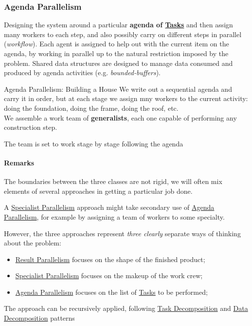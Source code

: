 \subsubsection{Agenda Parallelism}\label{sub:ed_agenda_parallelism} %
Designing the system around a particular \textbf{agenda of \hyperref[def:task]{Tasks}} and then assign many workers to each step, and also possibly carry on different steps in parallel (\textit{workflow}).
Each agent is assigned to help out with the current item on the agenda, by working in parallel up to the natural restriction imposed by the problem.
\emptyln{}
Shared data structures are designed to manage data consumed and produced by agenda activities (e.g. \textit{bounded-buffers}).
\begin{example}{Agenda Parallelism: Building a House}{}
    We write out a sequential agenda and carry it in order, but at each stage we assign mny workers to the current activity: doing the foundation, doing the frame, doing the roof, etc.
    \\
    We assemble a work team of \textbf{generalists}, each one capable of performing any construction step.
    \begin{note}
        The team is set to work stage by stage following the agenda
    \end{note}
\end{example}
%
\paragraph{Remarks}\label{par:ed_cc_remarks} %
The boundaries between the three classes are not rigid, we will often mix elements of several approaches in getting a particular job done.
\begin{example}{}{}
    A \hyperref[sub:ed_specialist_parallelism]{Specialist Parallelism} approach might take secondary use of \hyperref[sub:ed_agenda_parallelism]{Agenda Parallelism}, for example by assigning a team of workers to some specialty.
\end{example}
However, the three approaches represent \textit{three clearly} separate ways of thinking about the problem:
\begin{itemize}
    \item \hyperref[sub:ed_result_parallelism]{Result Parallelism} focuses on the shape of the finished product;
    \item \hyperref[sub:ed_specialist_parallelism]{Specialist Parallelism} focuses on the makeup of the work crew;
    \item \hyperref[sub:ed_agenda_parallelism]{Agenda Parallelism} focuses on the list of \hyperref[def:task]{Tasks} to be performed;
\end{itemize}
\begin{note}
    The approach can be recursively applied, following \hyperref[sub:ed_task_decomposition_pattern]{Task Decomposition} and \hyperref[sub:ed_data_decomposition_pattern]{Data Decomposition} patterns
\end{note}
%
